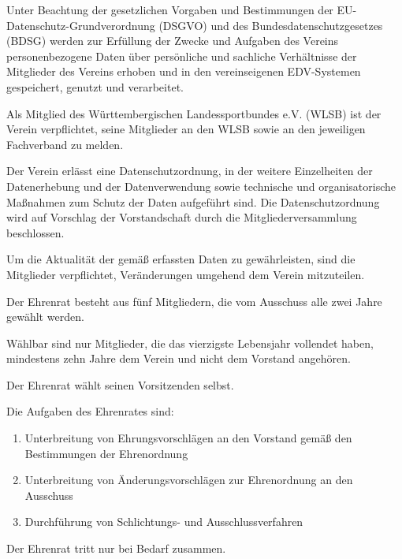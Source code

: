 \documentclass[10pt,a4paper,parskip=half]{scrartcl}
\begin{document}
\begin{contract}
    \label{C:Datenschutz}
    Unter Beachtung der gesetzlichen Vorgaben und Bestimmungen der EU-Datenschutz-Grundverordnung (DSGVO) und des Bundesdatenschutzgesetzes (BDSG) werden zur Erfüllung der Zwecke und Aufgaben des Vereins personenbezogene Daten über persönliche und sachliche Verhältnisse der Mitglieder des Vereins erhoben und in den vereinseigenen EDV-Systemen gespeichert, genutzt und verarbeitet. \label{S:Datenschutz}

    Als Mitglied des Württembergischen Landessportbundes e.V. (WLSB) ist der Verein verpflichtet, seine Mitglieder an den WLSB sowie an den jeweiligen Fachverband zu melden.
    
    Der Verein erlässt eine Datenschutzordnung, in der weitere Einzelheiten der Datenerhebung und der Datenverwendung sowie technische und organisatorische Maßnahmen zum Schutz der Daten aufgeführt sind. Die Datenschutzordnung wird auf Vorschlag der Vorstandschaft durch die Mitgliederversammlung beschlossen.
    
    Um die Aktualität der gemäß  erfassten Daten zu gewährleisten,
    sind die Mitglieder verpflichtet, Veränderungen umgehend dem Verein mitzuteilen.

    Der Ehrenrat besteht aus fünf Mitgliedern, die vom Ausschuss alle zwei Jahre gewählt werden.

    Wählbar sind nur Mitglieder, die das vierzigste Lebensjahr vollendet haben, mindestens zehn Jahre dem Verein und nicht dem Vorstand angehören.

    Der Ehrenrat wählt seinen Vorsitzenden selbst.

    Die Aufgaben des Ehrenrates sind:

    \begin{enumerate}[label=\alph*),noitemsep]
      \item Unterbreitung von Ehrungsvorschlägen an den Vorstand gemäß den Bestimmungen der Ehrenordnung
      \item Unterbreitung von Änderungsvorschlägen zur Ehrenordnung an den Ausschuss
      \item Durchführung von Schlichtungs- und Ausschlussverfahren
    \end{enumerate}

    Der Ehrenrat tritt nur bei Bedarf zusammen.
    
\end{contract}
\end{document}
